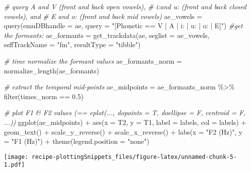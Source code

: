 \documentclass[
]{book}
\newenvironment{Shaded}{\begin{snugshade}}{\end{snugshade}}
\newcommand{\AttributeTok}[1]{\textcolor[rgb]{0.77,0.63,0.00}{#1}}
\newcommand{\CommentTok}[1]{\textcolor[rgb]{0.56,0.35,0.01}{\textit{#1}}}
\newcommand{\FloatTok}[1]{\textcolor[rgb]{0.00,0.00,0.81}{#1}}
\newcommand{\FunctionTok}[1]{\textcolor[rgb]{0.00,0.00,0.00}{#1}}
\newcommand{\NormalTok}[1]{#1}
\newcommand{\OtherTok}[1]{\textcolor[rgb]{0.56,0.35,0.01}{#1}}
\newcommand{\SpecialCharTok}[1]{\textcolor[rgb]{0.00,0.00,0.00}{#1}}
\newcommand{\StringTok}[1]{\textcolor[rgb]{0.31,0.60,0.02}{#1}}
\begin{document}
\begin{Shaded}
\begin{Highlighting}[]
\CommentTok{\# query A and V (front and back open vowels),}
\CommentTok{\# i:and u: (front and back closed vowels), and}
\CommentTok{\# E and o: (front and back mid vowels)}
\NormalTok{ae\_vowels }\OtherTok{=} \FunctionTok{query}\NormalTok{(}\AttributeTok{emuDBhandle =}\NormalTok{ ae,}
                  \AttributeTok{query =} \StringTok{"[Phonetic == V | A | i: | u: | o: | E]"}\NormalTok{)}
\CommentTok{\#get the formants:}
\NormalTok{ae\_formants }\OtherTok{=} \FunctionTok{get\_trackdata}\NormalTok{(ae, }
                            \AttributeTok{seglist =}\NormalTok{ ae\_vowels,}
                            \AttributeTok{ssffTrackName =} \StringTok{"fm"}\NormalTok{,}
                            \AttributeTok{resultType =} \StringTok{"tibble"}\NormalTok{)}

\CommentTok{\# time normalize the formant values}
\NormalTok{ae\_formants\_norm }\OtherTok{=} \FunctionTok{normalize\_length}\NormalTok{(ae\_formants)}

\CommentTok{\# extract the temporal mid{-}points}
\NormalTok{ae\_midpoints }\OtherTok{=}\NormalTok{ ae\_formants\_norm }\SpecialCharTok{\%\textgreater{}\%} 
  \FunctionTok{filter}\NormalTok{(times\_norm }\SpecialCharTok{==} \FloatTok{0.5}\NormalTok{)}

\CommentTok{\# plot F1 \& F2 values (== eplot(..., dopoints = T, doellipse = F, centroid = F, ...))}
\FunctionTok{ggplot}\NormalTok{(ae\_midpoints) }\SpecialCharTok{+}
  \FunctionTok{aes}\NormalTok{(}\AttributeTok{x =}\NormalTok{ T2, }\AttributeTok{y =}\NormalTok{ T1, }\AttributeTok{label =}\NormalTok{ labels, }\AttributeTok{col =}\NormalTok{ labels) }\SpecialCharTok{+}
  \FunctionTok{geom\_text}\NormalTok{() }\SpecialCharTok{+}
  \FunctionTok{scale\_y\_reverse}\NormalTok{() }\SpecialCharTok{+} \FunctionTok{scale\_x\_reverse}\NormalTok{() }\SpecialCharTok{+} 
  \FunctionTok{labs}\NormalTok{(}\AttributeTok{x =} \StringTok{"F2 (Hz)"}\NormalTok{, }\AttributeTok{y =} \StringTok{"F1 (Hz)"}\NormalTok{) }\SpecialCharTok{+}
  \FunctionTok{theme}\NormalTok{(}\AttributeTok{legend.position =} \StringTok{"none"}\NormalTok{)}
\end{Highlighting}
\end{Shaded}

\texttt{[image: recipe-plottingSnippets\_files/figure-latex/unnamed-chunk-5-1.pdf]}
\end{document}
